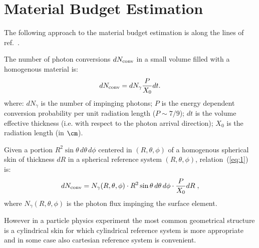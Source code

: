 \section{Material Budget Estimation}
\label{correctionFactors}

The following approach to the material budget estimation is along the lines of ref.~\cite{steve}. 

The number of photon conversions $dN_{\rm conv}$ in a
small volume filled with a homogenous material is:
\begin{equation}
dN_{\rm conv} = dN_{\gamma} \frac{P}{X_0} dt .
\label{eq:1}
\end{equation}
where: $dN_\gamma$ is the number of impinging photons; $P$ is the energy dependent conversion probability per unit
radiation length ($P\sim 7/9$); $dt$ is the volume effective thickness (i.e. with respect to the photon arrival direction); $X_0$ is the radiation length (in $\cm$).

Given a portion $R^2 \sin \theta\, d\theta\, d\phi$ centered in $(R,\theta,\phi)$ of a homogenous spherical skin of 
thickness $dR$ in a spherical reference system $(R, \theta, \phi)$,
relation~(\ref{eq:1}) is:
\begin{equation}
dN_{\rm conv} = N_{\gamma}(R, \theta, \phi) \cdot R^2 \sin \theta \, d\theta\, d\phi \cdot \frac{P}{X_0} dR \;,
\label{eq:2}
\end{equation}
where $N_\gamma(R,\theta,\phi)$ is the photon flux impinging the surface element.

However in a particle physics experiment the most common geometrical
structure is a cylindrical skin for which cylindrical reference system
is more appropriate and in some case also cartesian reference system
is convenient.


